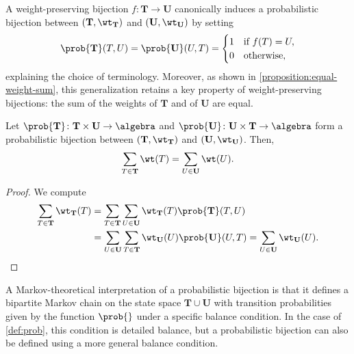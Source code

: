 A weight-preserving bijection \( f \colon \mathbf{T} \to \mathbf{U} \)
canonically induces a probabilistic bijection
between \((\mathbf{T}, \wt_{\mathbf{T}})\) and \((\mathbf{U}, \wt_{\mathbf{U}})\)
by setting
\begin{equation*}
	\prob{\mathbf{T}}(T, U) = \prob{\mathbf{U}}(U, T) =
	\begin{cases}
		1 & \text{if } f(T) = U, \\
		0 & \text{otherwise},
	\end{cases}
\end{equation*}
explaining the choice of terminology.
Moreover, as shown in \cref{proposition:equal-weight-sum},
this generalization retains a key property of weight-preserving bijections:
the sum of the weights of \(\mathbf{T}\) and of \(\mathbf{U}\) are equal.

\begin{proposition}
	\label{proposition:equal-weight-sum}
	Let \(\prob{\mathbf{T}} \colon \mathbf{T} \times \mathbf{U} \to \algebra\)
	and \(\prob{\mathbf{U}} \colon \mathbf{U} \times \mathbf{T} \to \algebra\)
	form a probabilistic bijection between
	\( (\mathbf{T}, \wt_{\mathbf{T}}) \) and
	\( (\mathbf{U}, \wt_{\mathbf{U}}) \).
	Then,
	\begin{equation*}
		\sum_{T \in \mathbf{T}} \wt(T) = \sum_{U \in\mathbf{U}} \wt(U).
	\end{equation*}
\end{proposition}

\begin{proof}
	We compute
	\begin{align*}
		\sum_{T \in \mathbf{T}} \wt_{\mathbf{T}}(T)
		&= \sum_{T \in \mathbf{T}} \sum_{U \in \mathbf{U}}
			\wt_{\mathbf{T}}(T) \prob{\mathbf{T}}(T, U) \\
		&= \sum_{U \in \mathbf{U}} \sum_{T \in \mathbf{T}}
			\wt_{\mathbf{U}}(U) \prob{\mathbf{U}}(U, T)
		= \sum_{U \in \mathbf{U}} \wt_{\mathbf{U}}(U). \qedhere
	\end{align*}
\end{proof}

A Markov-theoretical interpretation of a probabilistic bijection is that
it defines a bipartite Markov chain on the state space \( \mathbf{T} \cup \mathbf{U} \)
with transition probabilities given by the function \( \prob{} \) under a specific balance condition.
In the case of \cref{def:prob}, this condition is detailed balance,
but a probabilistic bijection can also be defined using a more general balance condition.
